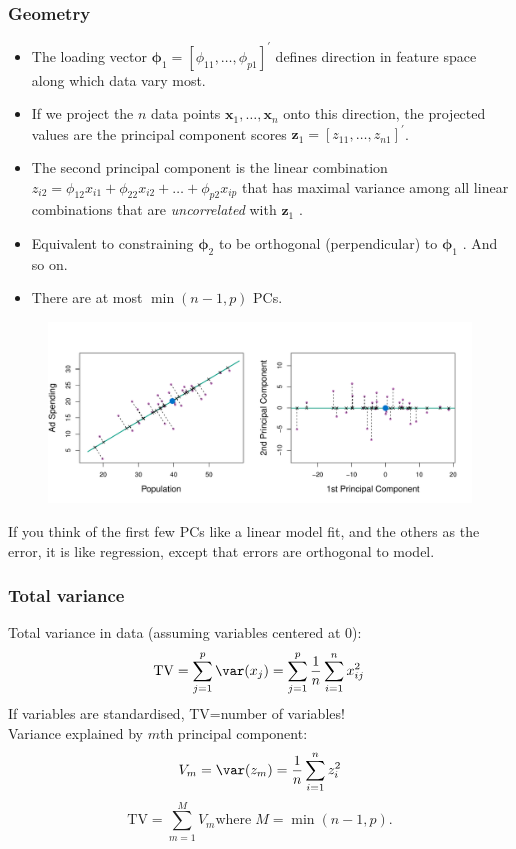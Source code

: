 \documentclass[a4paper]{article}\usepackage[]{graphicx}\usepackage[]{xcolor}
\begin{document}
\subsubsection{Geometry}
\begin{itemize}
	\item The loading vector \( \symbf{\phi}_1 = [\phi_{11},\dots,\phi_{p1}]^\prime \) defines direction in feature space along which data vary most.
	\item If we project the \( n \) data points \( \symbf{x}_1,\dotsc,\symbf{x}_n \) onto this direction, the projected values are the principal component scores \( \symbf{z}_1 = [z_{11},\dotsc,z_{n1}]^\prime \).
	\item The second principal component is the linear combination \( z_{i2} = \phi_{12}x_{i1} + \phi_{22}x_{i2} + \dots + \phi_{p2}x_{ip} \) that has maximal variance among all linear combinations that are \textit{uncorrelated} with \( \symbf{z}_1 \) .
	\item Equivalent to constraining \( \symbf{\phi}_2 \) to be orthogonal (perpendicular) to \( \symbf{\phi}_1 \) . And so on.
	\item There are at most \( \min(n - 1, p) \) PCs.
\end{itemize}
\begin{figure}[H]
	\centering
	\includegraphics[scale=0.6]{6_15}
\end{figure}
If you think of the first few PCs like a linear model fit, and the others as the error, it is like regression, except that errors are orthogonal to model.
\subsubsection{Total variance}
\textcolor{myred}{Total variance} in data (assuming variables centered at 0):
\[
	\mathrm{TV} = \sum_{j=1}^p \var(x_j) = \sum_{j=1}^p \frac{1}{n}\sum_{i=1}^n x_{ij}^2
\]
If variables are standardised, TV=number of variables!\\
\textcolor{myred}{Variance explained} by \( m \)th principal component:
\[
	V_m = \var(z_m) = \frac{1}{n}\sum_{i=1}^n z_{i}^2
\]
\[
	\mathrm{TV} = \sum_{m=1}^M V_m \mathrm{where}\; M=\min(n-1,p).
\]
\end{document}
